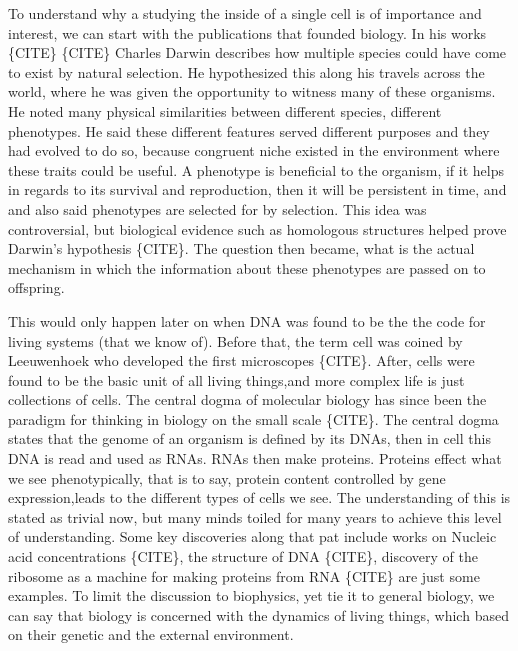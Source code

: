 \documentclass[draft, english]{volcanica-template}
\begin{document}
To understand why a studying the inside of a single cell is of importance and interest, we can start with the publications that founded biology. In his works \{CITE\} \{CITE\} Charles Darwin describes how multiple species could have come to exist by natural selection. He hypothesized this along his travels across the world, where he was given the opportunity to witness many of these organisms. He noted many physical similarities between different species, different phenotypes. He said these different features served different purposes and they had evolved to do so, because congruent niche existed in the environment where these traits could be useful. A phenotype is beneficial to the organism, if it helps in regards to its survival and reproduction, then it will be persistent in time, and and also said phenotypes are selected for by selection. This idea was controversial, but biological evidence such as homologous structures helped prove Darwin's hypothesis \{CITE\}. The question then became, what is the actual mechanism in which the information about these phenotypes are passed on to offspring.

This would only happen later on when DNA was found to be the the code for living systems (that we know of). Before that, the term cell was coined by Leeuwenhoek who developed the first microscopes \{CITE\}. After, cells were found to be the basic unit of all living things,and more complex life is just collections of cells. The central dogma of molecular biology has since been the paradigm for thinking in biology on the small scale \{CITE\}. The central dogma states that the genome of an organism is defined by its DNAs, then in cell this DNA is read and used as RNAs. RNAs then make proteins. Proteins effect what we see phenotypically, that is to say, protein content controlled by gene expression,leads to the different types of cells we see. The understanding of this is stated as trivial now, but many minds toiled for many years to achieve this level of understanding. Some key discoveries along that pat include works on Nucleic acid concentrations \{CITE\}, the structure of DNA \{CITE\}, discovery of the ribosome as a machine for making proteins from RNA \{CITE\} are just some examples. To limit the discussion to biophysics, yet tie it to general biology, we can say that biology is concerned with the dynamics of living things, which based on their genetic and the external environment.
\end{document}
